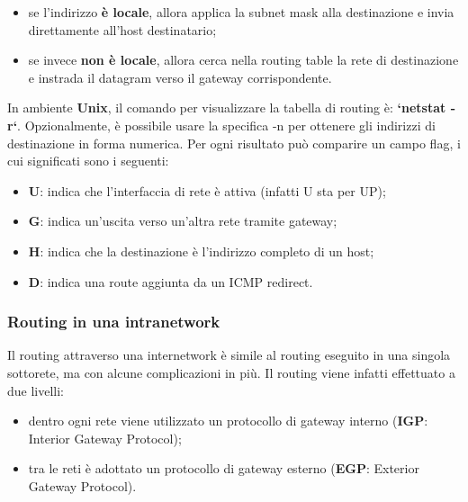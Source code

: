             \begin{itemize}
                \item se l’indirizzo \textbf{è locale}, allora applica la subnet mask alla destinazione e invia
                direttamente all’host destinatario;
                \item se invece \textbf{non è locale}, allora cerca nella routing table la rete di destinazione e instrada
                il datagram verso il gateway corrispondente.
            \end{itemize}

            In ambiente \textbf{Unix}, il comando per visualizzare la tabella di routing è: \textbf{`netstat -r`}.
            Opzionalmente, è possibile usare la specifica -n per ottenere gli indirizzi di destinazione in
            forma numerica. Per ogni risultato può comparire un campo flag, i cui significati sono i seguenti:

            \begin{itemize}
                \item \textbf{U}: indica che l’interfaccia di rete è attiva (infatti U sta per UP);
                \item \textbf{G}: indica un’uscita verso un’altra rete tramite gateway;
                \item \textbf{H}: indica che la destinazione è l’indirizzo completo di un host;
                \item \textbf{D}: indica una route aggiunta da un ICMP redirect.
            \end{itemize}
            
            \subsubsection{Routing in una intranetwork}
            Il routing attraverso una internetwork è simile al routing eseguito in una singola sottorete, ma
            con alcune complicazioni in più. Il routing viene infatti effettuato a due livelli:

            \begin{itemize}
                \item dentro ogni rete viene utilizzato un protocollo di gateway interno
                (\textbf{IGP}: Interior Gateway Protocol);
                \item tra le reti è adottato un protocollo di gateway esterno (\textbf{EGP}: Exterior Gateway Protocol).
            \end{itemize}

